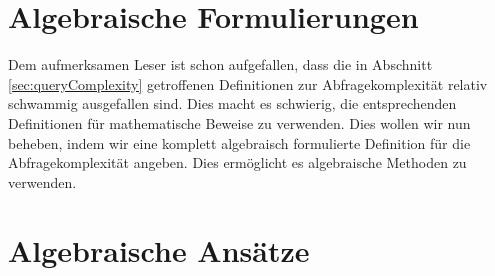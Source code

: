 \documentclass[a4paper]{scrreprt}
\theoremstyle{definition}
\begin{document}
\section{Algebraische Formulierungen}
Dem aufmerksamen Leser ist schon aufgefallen, dass die in 
Abschnitt \ref{sec:queryComplexity} getroffenen Definitionen
zur Abfragekomplexität relativ schwammig ausgefallen sind.
Dies macht es schwierig, die entsprechenden Definitionen
für mathematische Beweise zu verwenden.
Dies wollen wir nun beheben, indem wir eine komplett algebraisch
formulierte Definition für die Abfragekomplexität angeben.
Dies ermöglicht es algebraische Methoden zu verwenden.


\section{Algebraische Ansätze}


\printbibliography
\end{document}
